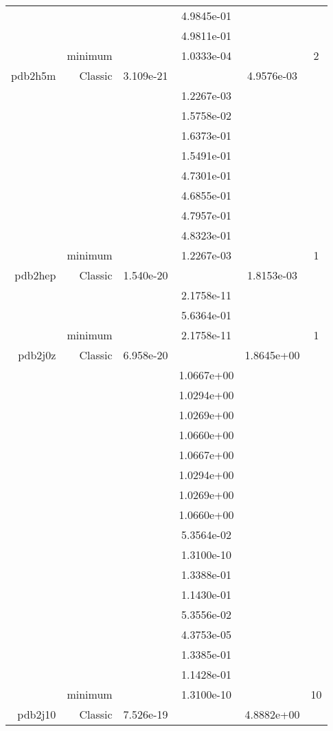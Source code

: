 \begin{xltabular}{\textwidth}{r|rS[table-format=1.3e+2]S[table-format=1.4e+2]S[table-format=1.4e+2]S[table-format=-1.5]}
&  &  & 4.9845e-01 & & \\
&  &  & 4.9811e-01 & & \\
& minimum &  & 1.0333e-04 & & 2 \\  \addlinespace
pdb2h5m & Classic & 3.109e-21 &  & 4.9576e-03 & \\
&  &  & 1.2267e-03 & & \\
&  &  & 1.5758e-02 & & \\
&  &  & 1.6373e-01 & & \\
&  &  & 1.5491e-01 & & \\
&  &  & 4.7301e-01 & & \\
&  &  & 4.6855e-01 & & \\
&  &  & 4.7957e-01 & & \\
&  &  & 4.8323e-01 & & \\
& minimum &  & 1.2267e-03 & & 1 \\  \addlinespace
pdb2hep & Classic & 1.540e-20 &  & 1.8153e-03 & \\
&  &  & 2.1758e-11 & & \\
&  &  & 5.6364e-01 & & \\
& minimum &  & 2.1758e-11 & & 1 \\  \addlinespace
pdb2j0z & Classic & 6.958e-20 &  & 1.8645e+00 & \\
&  &  & 1.0667e+00 & & \\
&  &  & 1.0294e+00 & & \\
&  &  & 1.0269e+00 & & \\
&  &  & 1.0660e+00 & & \\
&  &  & 1.0667e+00 & & \\
&  &  & 1.0294e+00 & & \\
&  &  & 1.0269e+00 & & \\
&  &  & 1.0660e+00 & & \\
&  &  & 5.3564e-02 & & \\
&  &  & 1.3100e-10 & & \\
&  &  & 1.3388e-01 & & \\
&  &  & 1.1430e-01 & & \\
&  &  & 5.3556e-02 & & \\
&  &  & 4.3753e-05 & & \\
&  &  & 1.3385e-01 & & \\
&  &  & 1.1428e-01 & & \\
& minimum &  & 1.3100e-10 & & 10 \\  \addlinespace
pdb2j10 & Classic & 7.526e-19 &  & 4.8882e+00 & \\

\end{xltabular}
